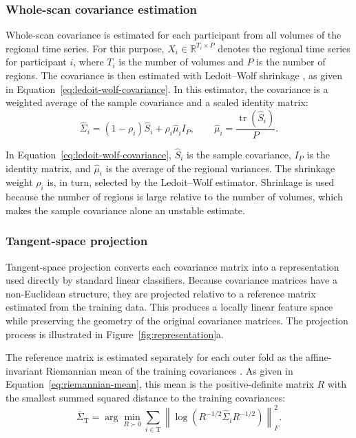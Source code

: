 \subsubsection{Whole-scan covariance estimation}
\label{subsubsec:covariance-estimation}

Whole-scan covariance is estimated for each participant from all volumes of the regional
time series. For this purpose, $X_i \in \mathbb{R}^{T_i \times P}$ denotes the regional
time series for participant $i$, where $T_i$ is the number of volumes and $P$ is the
number of regions. The covariance is then estimated with Ledoit--Wolf shrinkage
\citep{LedoitWolf2004}, as given in Equation~\eqref{eq:ledoit-wolf-covariance}. In this estimator, the
covariance is a weighted average of the sample covariance and a scaled identity matrix:
\begin{equation}
\widehat{\Sigma}_i
=
(1-\rho_i)\widehat{S}_i
+
\rho_i \widehat{\mu}_i I_P,
\qquad
\widehat{\mu}_i
=
\frac{\operatorname{tr}(\widehat{S}_i)}{P}.
\label{eq:ledoit-wolf-covariance}
\end{equation}

In Equation~\eqref{eq:ledoit-wolf-covariance}, $\widehat{S}_i$ is the sample covariance, $I_P$ is the identity
matrix, and $\widehat{\mu}_i$ is the average of the regional variances. The shrinkage
weight $\rho_i$ is, in turn, selected by the Ledoit--Wolf estimator. Shrinkage is used
because the number of regions is large relative to the number of volumes, which makes the
sample covariance alone an unstable estimate.

\subsubsection{Tangent-space projection}
\label{subsubsec:tangent-projection}

Tangent-space projection converts each covariance matrix into a representation 
used directly by standard linear classifiers. Because covariance matrices have a
non-Euclidean structure, they are projected relative to a reference matrix estimated from
the training data. This produces a locally linear feature space while preserving the
geometry of the original covariance matrices. The projection process is illustrated in
Figure~\ref{fig:representation}a.

The reference matrix is estimated separately for each outer fold as the affine-invariant
Riemannian mean of the training covariances \citep{Varoquauxetal2010,Dadietal2019}. As
given in Equation~\eqref{eq:riemannian-mean}, this mean is the positive-definite matrix $R$ with the
smallest summed squared distance to the training covariances:
\begin{equation}
\overline{\Sigma}_{\mathrm{T}}
=
\arg\min_{R \succ 0}
\sum_{i \in \mathrm{T}}
\left\|
\log\!\left(R^{-1/2}\widehat{\Sigma}_iR^{-1/2}\right)
\right\|_F^2.
\label{eq:riemannian-mean}
\end{equation}


